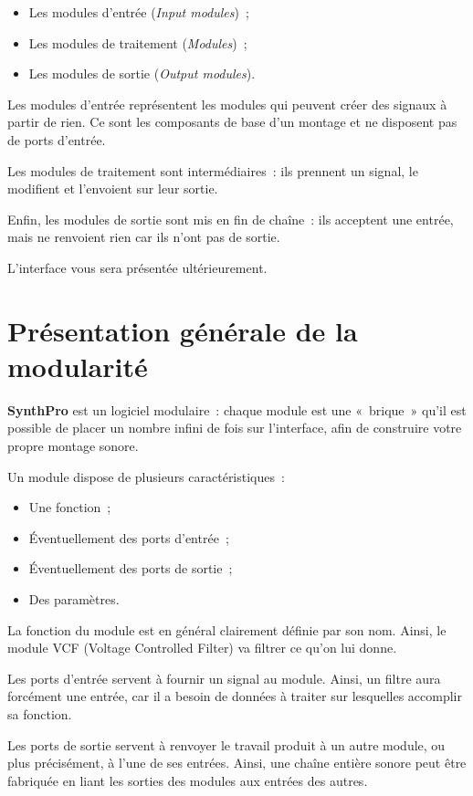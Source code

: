 \documentclass[a4paper,oneside,frenchb,10pt]{article}
\begin{document}
\begin{itemize}
\item
  Les modules d'entrée (\emph{Input modules})~;
\item
  Les modules de traitement (\emph{Modules})~;
\item
  Les modules de sortie (\emph{Output modules}).
\end{itemize}

Les modules d'entrée représentent les modules qui peuvent créer des
signaux à partir de rien. Ce sont les composants de base d'un montage et
ne disposent pas de ports d'entrée.

Les modules de traitement sont intermédiaires~: ils prennent un signal,
le modifient et l’envoient sur leur sortie.

Enfin, les modules de sortie sont mis en fin de chaîne~: ils acceptent
une entrée, mais ne renvoient rien car ils n'ont pas de sortie.

L'interface vous sera présentée ultérieurement.

\section{Présentation générale de la modularité}

\textbf{SynthPro} est un logiciel modulaire~: chaque module est une «~brique~»
qu'il est possible de placer un nombre infini de fois sur l'interface,
afin de construire votre propre montage sonore.

Un module dispose de plusieurs caractéristiques~:

\begin{itemize}
\item
  Une fonction~;
\item
  Éventuellement des ports d'entrée~;
\item
  Éventuellement des ports de sortie~;
\item
  Des paramètres.
\end{itemize}
La fonction du module est en général clairement définie par son nom.
Ainsi, le module VCF (Voltage Controlled Filter) va filtrer ce qu'on lui donne.

Les ports d'entrée servent à fournir un signal au module. Ainsi, un
filtre aura forcément une entrée, car il a besoin de données à traiter
sur lesquelles accomplir sa fonction.

Les ports de sortie servent à renvoyer le travail produit à un autre
module, ou plus précisément, à l'une de ses entrées. Ainsi, une chaîne
entière sonore peut être fabriquée en liant les sorties des modules aux
entrées des autres.
\end{document}
